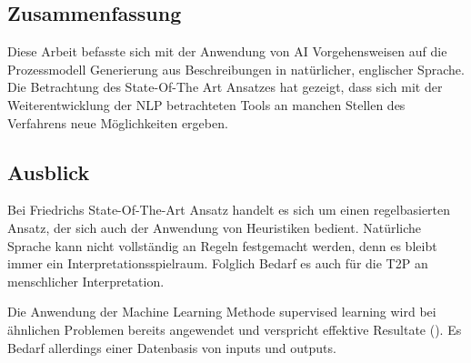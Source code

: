 \subsection{Zusammenfassung}
Diese Arbeit befasste sich mit der Anwendung von \ac{AI} Vorgehensweisen auf die Prozessmodell Generierung aus Beschreibungen in natürlicher, englischer Sprache. 
Die Betrachtung des State-Of-The Art Ansatzes hat gezeigt, dass sich mit der Weiterentwicklung der \ac{NLP} betrachteten Tools an manchen Stellen des Verfahrens neue Möglichkeiten ergeben.

\subsection{Ausblick}
Bei Friedrichs State-Of-The-Art Ansatz handelt es sich um einen regelbasierten Ansatz, der sich auch der Anwendung von Heuristiken bedient. Natürliche Sprache kann nicht vollständig an Regeln festgemacht werden, denn es bleibt immer ein Interpretationsspielraum. Folglich Bedarf es auch für die \ac{T2P} an menschlicher Interpretation. \par
Die Anwendung der Machine Learning Methode supervised learning wird bei ähnlichen Problemen bereits angewendet und verspricht effektive Resultate (\cite[vgl.][2]{BPMML}). Es Bedarf allerdings einer Datenbasis von inputs und outputs.